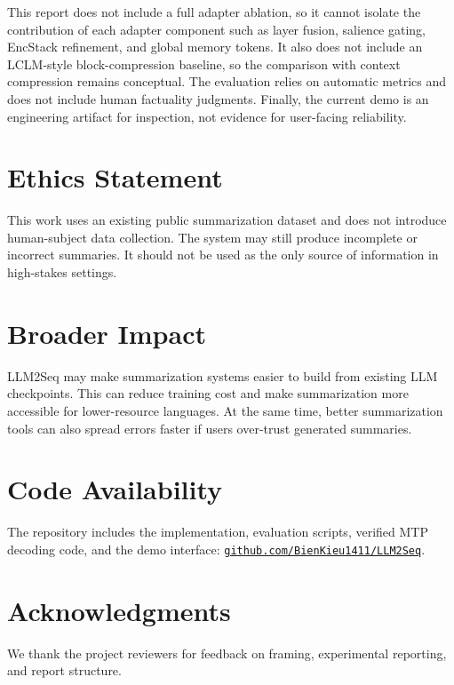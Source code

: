 \documentclass[11pt]{article}
\begin{document}
This report does not include a full adapter ablation, so it cannot isolate the contribution of each adapter component such as layer fusion, salience gating, EncStack refinement, and global memory tokens.
It also does not include an LCLM-style block-compression baseline, so the comparison with context compression remains conceptual.
The evaluation relies on automatic metrics and does not include human factuality judgments.
Finally, the current demo is an engineering artifact for inspection, not evidence for user-facing reliability.

\section*{Ethics Statement}

This work uses an existing public summarization dataset and does not introduce human-subject data collection.
The system may still produce incomplete or incorrect summaries.
It should not be used as the only source of information in high-stakes settings.

\section*{Broader Impact}

LLM2Seq may make summarization systems easier to build from existing LLM checkpoints.
This can reduce training cost and make summarization more accessible for lower-resource languages.
At the same time, better summarization tools can also spread errors faster if users over-trust generated summaries.

\section*{Code Availability}

The repository includes the implementation, evaluation scripts, verified MTP decoding code, and the demo interface:
\href{https://github.com/BienKieu1411/LLM2Seq}{\texttt{github.com/BienKieu1411/LLM2Seq}}.

\section*{Acknowledgments}

We thank the project reviewers for feedback on framing, experimental reporting, and report structure.



\appendix
\end{document}
